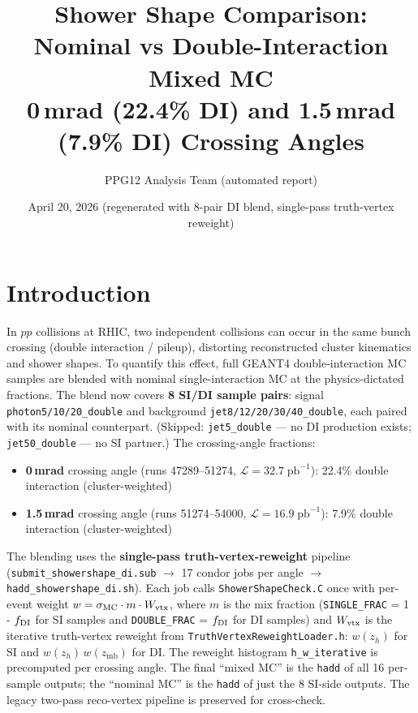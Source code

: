 \documentclass[11pt,a4paper]{article}
\title{Shower Shape Comparison:\\
Nominal vs Double-Interaction Mixed MC\\[4pt]
\large 0\,mrad (22.4\% DI) and 1.5\,mrad (7.9\% DI) Crossing Angles}
\author{PPG12 Analysis Team (automated report)}
\date{April 20, 2026 (regenerated with 8-pair DI blend, single-pass truth-vertex reweight)}
\begin{document}
\maketitle

\section{Introduction}
\label{sec:intro}

In $pp$ collisions at RHIC, two independent collisions can occur in the same
bunch crossing (double interaction / pileup), distorting reconstructed cluster
kinematics and shower shapes.  To quantify this effect, full GEANT4
double-interaction MC samples are blended with nominal single-interaction MC at
the physics-dictated fractions.  The blend now covers \textbf{8 SI/DI sample
pairs}: signal \texttt{photon5/10/20\_double} and background
\texttt{jet8/12/20/30/40\_double}, each paired with its nominal counterpart.
(Skipped: \texttt{jet5\_double} — no DI production exists;
\texttt{jet50\_double} — no SI partner.)  The crossing-angle fractions:
\begin{itemize}
\item \textbf{0\,mrad} crossing angle (runs 47289--51274,
  $\mathcal{L} = 32.7\;\mathrm{pb}^{-1}$): 22.4\% double interaction (cluster-weighted)
\item \textbf{1.5\,mrad} crossing angle (runs 51274--54000,
  $\mathcal{L} = 16.9\;\mathrm{pb}^{-1}$): 7.9\% double interaction (cluster-weighted)
\end{itemize}

\sloppy
The blending uses the \textbf{single-pass truth-vertex-reweight} pipeline
(\texttt{submit\_showershape\_di.sub} $\rightarrow$ 17 condor jobs per angle
$\rightarrow$ \texttt{hadd\_showershape\_di.sh}).  Each job calls
\texttt{ShowerShapeCheck.C} once with per-event weight
$w = \sigma_{\rm MC} \cdot m \cdot W_{\rm vtx}$, where $m$ is the mix fraction
(\texttt{SINGLE\_FRAC} = 1 - $f_{\rm DI}$ for SI samples and
\texttt{DOUBLE\_FRAC} = $f_{\rm DI}$ for DI samples) and $W_{\rm vtx}$ is the
iterative truth-vertex reweight from
\texttt{TruthVertexReweightLoader.h}: $w(z_h)$ for SI and
$w(z_h)\,w(z_\mathrm{mb})$ for DI.  The reweight histogram
\texttt{h\_w\_iterative} is precomputed per crossing angle.  The final
``mixed MC'' is the \texttt{hadd} of all 16 per-sample outputs; the
``nominal MC'' is the \texttt{hadd} of just the 8 SI-side outputs.  The
legacy two-pass reco-vertex pipeline is preserved for cross-check.
\fussy
\end{document}
